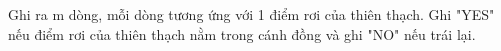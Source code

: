 Ghi ra m dòng, mỗi dòng tương ứng với 1 điểm rơi của thiên thạch. Ghi "YES" nếu điểm rơi của thiên thạch nằm trong cánh đồng và ghi "NO" nếu trái lại.